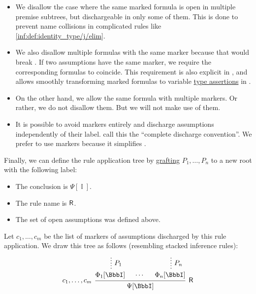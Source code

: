 \begin{definition}
\begin{thmenum}[resume=def:natural_deduction_proof_tree]
\begin{itemize}
      \item We disallow the case where the same marked formula is open in multiple premise subtrees, but dischargeable in only some of them. This is done to prevent name collisions in complicated rules like \ref{inf:def:identity_type/j/elim}.

      \item We also disallow multiple formulas with the same marker because that would break . If two assumptions have the same marker, we require the corresponding formulas to coincide. This requirement is also explicit in \cite[\S 2.1.8]{TroelstraSchwichtenberg2000BasicProofTheory}, and allows smoothly transforming marked formulas to variable \hyperref[def:type_assertion]{type assertions} in .

      \item On the other hand, we allow the same formula with multiple markers. Or rather, we do not disallow them. But we will not make use of them.

      \item It is possible to avoid markers entirely and discharge assumptions independently of their label.  call this the \enquote{complete discharge convention}. We prefer to use markers because it simplifies .
    \end{itemize}

    Finally, we can define the rule application tree by \hyperref[def:ordered_tree_grafting_product]{grafting} \( P_1, \ldots, P_n \) to a new root with the following label:
    \begin{itemize}
      \item The conclusion is \( \Psi[\BbbI] \).
      \item The rule name is \( \textsf{R} \).
      \item The set of open assumptions was defined above.
    \end{itemize}

    Let \( c_1, \ldots, c_m \) be the list of markers of assumptions discharged by this rule application. We draw this tree as follows (resembling stacked inference rules):
    \begin{equation*}
      \begin{prooftree}
        \hypo{}
        \ellipsis { \( P_1 \) } { \Phi_1[\BbbI] }

        \hypo{ \cdots }

        \hypo{}
        \ellipsis { \( P_n \) } { \Phi_n[\BbbI] }
        \infer[left label={\( c_1, \ldots, c_m \)}]3[\logic{R}]{ \Psi[\BbbI] }
      \end{prooftree}
    \end{equation*}
  \end{thmenum}
\end{definition}
